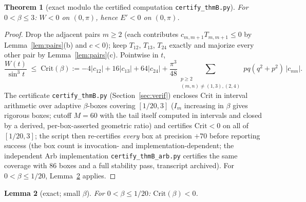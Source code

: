 \documentclass[11pt]{article}
\newtheorem{theorem}{Theorem}
\newtheorem{lemma}[theorem]{Lemma}
\theoremstyle{remark}
\begin{document}
\begin{theorem}[exact modulo the certified computation
\texttt{certify\_thmB.py}]\label{thm:B}
For $0<\beta\le3$:\; $W<0$ on $(0,\pi)$, hence $E'<0$ on $(0,\pi)$.
\end{theorem}

\begin{proof}
Drop the adjacent pairs $m\ge2$ (each contributes $c_{m,m+1}T_{m,m+1}
\le0$ by Lemma~\ref{lem:pairs}(b) and $c<0$); keep $T_{12}$, $T_{13}$,
$T_{24}$ exactly and majorize every other pair by
Lemma~\ref{lem:pairs}(c). Pointwise in $t$,
\[
\frac{W(t)}{\sin^3t}\;\le\;\mathrm{Crit}(\beta):=
-4|c_{12}|+16|c_{13}|+64|c_{24}|
+\frac{\pi^3}{48}\!\!\sum_{\substack{p\ge2\\(m,n)\ne(1,3),(2,4)}}\!\!
pq(q^2+p^2)\,|c_{mn}| .
\]
The certificate \texttt{certify\_thmB.py} (Section~\ref{sec:verif})
encloses $\mathrm{Crit}$ in interval arithmetic over adaptive
$\beta$-boxes covering $[1/20,3]$ ($I_m$ increasing in $\beta$ gives
rigorous boxes; cutoff $M=60$ with the tail itself computed in
intervals and closed by a derived, per-box-asserted geometric ratio) and
certifies $\mathrm{Crit}<0$ on all of $[1/20,3]$; the
script then re-certifies \emph{every} box at precision $+70$ before
reporting success (the box count is invocation- and implementation-dependent; the
independent Arb implementation \texttt{certify\_thmB\_arb.py} certifies
the same coverage with $86$ boxes and a full stability pass, transcript
archived). For $0<\beta\le1/20$, Lemma~\ref{lem:smallbeta} applies.
\end{proof}

\begin{lemma}[exact; small $\beta$]\label{lem:smallbeta}
For $0<\beta\le1/20$:\; $\mathrm{Crit}(\beta)<0$.
\end{lemma}
\end{document}
